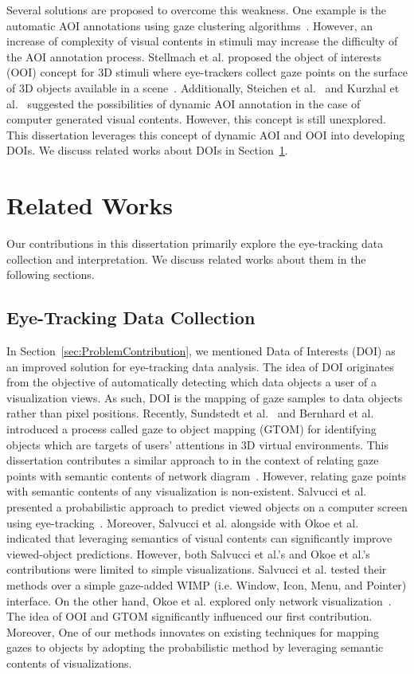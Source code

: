 Several solutions are proposed to overcome this weakness. One example is the automatic AOI annotations using gaze clustering algorithms~\cite{Pri00, San04, Dru14}. However, an increase of complexity of visual contents in stimuli may increase the difficulty of the AOI annotation process. Stellmach et al. proposed the object of interests (OOI) concept for 3D stimuli where eye-trackers collect gaze points on the surface of 3D objects available in a scene~\cite{Ste10}. Additionally, Steichen et al.~\cite{Ste13} and Kurzhal et al.~\cite{Kur14} suggested the possibilities of dynamic AOI annotation in the case of computer generated visual contents. However, this concept is still unexplored. This dissertation leverages this concept of dynamic AOI and OOI into developing DOIs. We discuss related works about DOIs in Section~\ref{sec:RelatedWorks}.

\section{Related Works}
\label{sec:RelatedWorks}
Our contributions in this dissertation primarily explore the eye-tracking data collection and interpretation. We discuss related works about them in the following sections.

\subsection{Eye-Tracking Data Collection} 
In Section~\ref{sec:ProblemContribution}, we mentioned Data of Interests (DOI) as an improved solution for eye-tracking data analysis. The idea of DOI originates from the objective of automatically detecting which data objects a user of a visualization views. As such, DOI is the mapping of gaze samples to data objects rather than pixel positions. Recently, Sundstedt et al.~\cite{Sun13} and Bernhard et al.~\cite{Bern14} introduced a process called gaze to object mapping (GTOM) for identifying objects which are targets of users' attentions in 3D virtual environments. This dissertation contributes a similar approach to in the context of relating gaze points with semantic contents of network diagram~\cite{Okoe14}. However, relating gaze points with semantic contents of any visualization is non-existent. Salvucci et al. presented a probabilistic approach to predict viewed objects on a computer screen using eye-tracking~\cite{Sal00}. Moreover, Salvucci et al. alongside with Okoe et al.~\cite{Okoe14} indicated that leveraging semantics of visual contents can significantly improve viewed-object predictions. However, both Salvucci et al.'s and Okoe et al.'s contributions were limited to simple visualizations. Salvucci et al. tested their methods over a simple gaze-added WIMP (i.e. Window, Icon, Menu, and Pointer) interface. On the other hand, Okoe et al. explored only network visualization~\cite{Okoe14}. The idea of OOI and GTOM significantly influenced our first contribution. Moreover, One of our methods innovates on existing techniques for mapping gazes to objects by adopting the probabilistic method by leveraging semantic contents of visualizations.  


